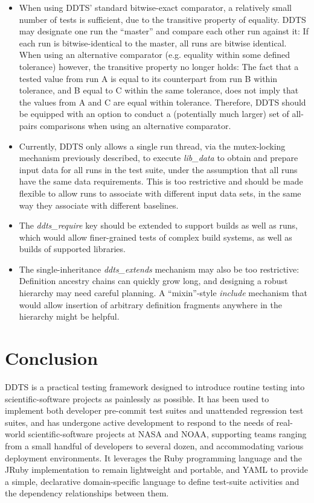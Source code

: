\documentclass[conference]{IEEEtran}
\begin{document}
\begin{itemize}
\item When using DDTS' standard bitwise-exact comparator, a relatively small number of tests is sufficient, due to the transitive property of equality. DDTS may designate one run the ``master'' and compare each other run against it: If each run is bitwise-identical to the master, all runs are bitwise identical. When using an alternative comparator (e.g. equality within some defined tolerance) however, the transitive property no longer holds: The fact that a tested value from run A is equal to its counterpart from run B within tolerance, and B equal to C within the same tolerance, does not imply that the values from A and C are equal within tolerance. Therefore, DDTS should be equipped with an option to conduct a (potentially much larger) set of all-pairs comparisons when using an alternative comparator.
\item Currently, DDTS only allows a single run thread, via the mutex-locking mechanism previously described, to execute \emph{lib\_data} to obtain and prepare input data for all runs in the test suite, under the assumption that all runs have the same data requirements. This is too restrictive and should be made flexible to allow runs to associate with different input data sets, in the same way they associate with different baselines.
\item The \emph{ddts\_require} key should be extended to support builds as well as runs, which would allow finer-grained tests of complex build systems, as well as builds of supported libraries.
\item The single-inheritance \emph{ddts\_extends} mechanism may also be too restrictive: Definition ancestry chains can quickly grow long, and designing a robust hierarchy may need careful planning. A ``mixin''-style \emph{include} mechanism that would allow insertion of arbitrary definition fragments anywhere in the hierarchy might be helpful.
\end{itemize}

\section{Conclusion}

DDTS is a practical testing framework designed to introduce routine testing into scientific-software projects as painlessly as possible. It has been used to implement both developer pre-commit test suites and unattended regression test suites, and has undergone active development to respond to the needs of real-world scientific-software projects at NASA and NOAA, supporting teams ranging from a small handful of developers to several dozen, and accommodating various deployment environments. It leverages the Ruby programming language and the JRuby implementation to remain lightweight and portable, and YAML to provide a simple, declarative domain-specific language to define test-suite activities and the dependency relationships between them.
\end{document}
